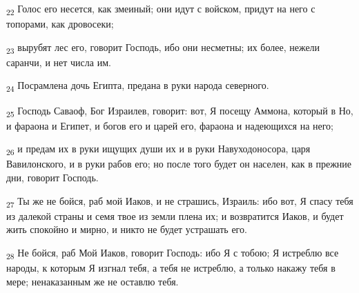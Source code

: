 \begin{tcolorbox}
\textsubscript{22} Голос его несется, как змеиный; они идут с войском, придут на него с топорами, как дровосеки;
\end{tcolorbox}
\begin{tcolorbox}
\textsubscript{23} вырубят лес его, говорит Господь, ибо они несметны; их более, нежели саранчи, и нет числа им.
\end{tcolorbox}
\begin{tcolorbox}
\textsubscript{24} Посрамлена дочь Египта, предана в руки народа северного.
\end{tcolorbox}
\begin{tcolorbox}
\textsubscript{25} Господь Саваоф, Бог Израилев, говорит: вот, Я посещу Аммона, который в Но, и фараона и Египет, и богов его и царей его, фараона и надеющихся на него;
\end{tcolorbox}
\begin{tcolorbox}
\textsubscript{26} и предам их в руки ищущих души их и в руки Навуходоносора, царя Вавилонского, и в руки рабов его; но после того будет он населен, как в прежние дни, говорит Господь.
\end{tcolorbox}
\begin{tcolorbox}
\textsubscript{27} Ты же не бойся, раб мой Иаков, и не страшись, Израиль: ибо вот, Я спасу тебя из далекой страны и семя твое из земли плена их; и возвратится Иаков, и будет жить спокойно и мирно, и никто не будет устрашать его.
\end{tcolorbox}
\begin{tcolorbox}
\textsubscript{28} Не бойся, раб Мой Иаков, говорит Господь: ибо Я с тобою; Я истреблю все народы, к которым Я изгнал тебя, а тебя не истреблю, а только накажу тебя в мере; ненаказанным же не оставлю тебя.
\end{tcolorbox}
